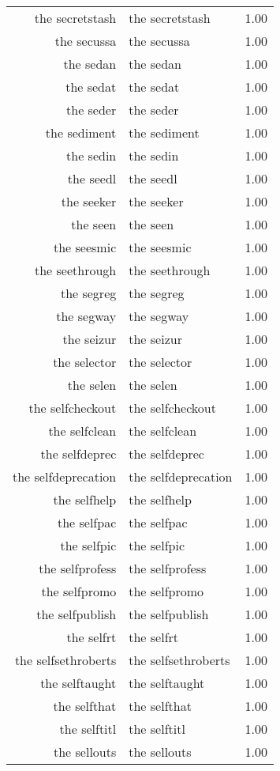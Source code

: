 \begin{table}[ht]
\begin{tabular}{rlr}
  the secretstash & the secretstash & 1.00 \\ 
  the secussa & the secussa & 1.00 \\ 
  the sedan & the sedan & 1.00 \\ 
  the sedat & the sedat & 1.00 \\ 
  the seder & the seder & 1.00 \\ 
  the sediment & the sediment & 1.00 \\ 
  the sedin & the sedin & 1.00 \\ 
  the seedl & the seedl & 1.00 \\ 
  the seeker & the seeker & 1.00 \\ 
  the seen & the seen & 1.00 \\ 
  the seesmic & the seesmic & 1.00 \\ 
  the seethrough & the seethrough & 1.00 \\ 
  the segreg & the segreg & 1.00 \\ 
  the segway & the segway & 1.00 \\ 
  the seizur & the seizur & 1.00 \\ 
  the selector & the selector & 1.00 \\ 
  the selen & the selen & 1.00 \\ 
  the selfcheckout & the selfcheckout & 1.00 \\ 
  the selfclean & the selfclean & 1.00 \\ 
  the selfdeprec & the selfdeprec & 1.00 \\ 
  the selfdeprecation & the selfdeprecation & 1.00 \\ 
  the selfhelp & the selfhelp & 1.00 \\ 
  the selfpac & the selfpac & 1.00 \\ 
  the selfpic & the selfpic & 1.00 \\ 
  the selfprofess & the selfprofess & 1.00 \\ 
  the selfpromo & the selfpromo & 1.00 \\ 
  the selfpublish & the selfpublish & 1.00 \\ 
  the selfrt & the selfrt & 1.00 \\ 
  the selfsethroberts & the selfsethroberts & 1.00 \\ 
  the selftaught & the selftaught & 1.00 \\ 
  the selfthat & the selfthat & 1.00 \\ 
  the selftitl & the selftitl & 1.00 \\ 
  the sellouts & the sellouts & 1.00 \\ 

\end{tabular}
\end{table}
